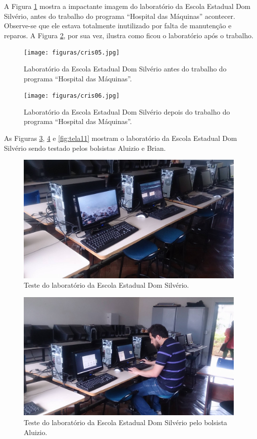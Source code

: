 \documentclass[
	12pt,				%
	openright,			%
	oneside,			%
	a4paper,			%
	english,			%
	spanish,			%
	brazil,				%
	]{abntex2}
\begin{document}
A Figura \ref{fig:tela5} mostra a impactante imagem do laboratório da Escola Estadual Dom Silvério, antes do trabalho do programa ``Hospital das Máquinas'' acontecer. Observe-se que ele estava totalmente inutilizado por falta de manutenção e reparos. A Figura \ref{fig:tela6}, por sua vez, ilustra como ficou o laboratório após o trabalho.

\begin{figure}[H]
	\centering
	\texttt{[image: figuras/cris05.jpg]}
	\caption{Laboratório da Escola Estadual Dom Silvério antes do trabalho do programa ``Hospital das Máquinas''.}
	\label{fig:tela5}
\end{figure}

\begin{figure}[H]
	\centering
	\texttt{[image: figuras/cris06.jpg]}
	\caption{Laboratório da Escola Estadual Dom Silvério depois do trabalho do programa ``Hospital das Máquinas''.}
	\label{fig:tela6}
\end{figure}

As Figuras \ref{fig:tela7}, \ref{fig:tela8} e \ref{fig:tela11} mostram o laboratório da Escola Estadual Dom Silvério sendo testado pelos bolsistas Aluizio e Brian.

\begin{figure}[H]
	\centering
	\includegraphics[scale=0.2]{figuras/cris07.jpg}
	\caption{Teste do laboratório da Escola Estadual Dom Silvério.}
	\label{fig:tela7}
\end{figure}

\begin{figure}[H]
	\centering
	\includegraphics[scale=0.2]{figuras/cris08.jpg}
	\caption{Teste do laboratório da Escola Estadual Dom Silvério pelo bolsista Aluizio.}
	\label{fig:tela8}
\end{figure}
\end{document}
